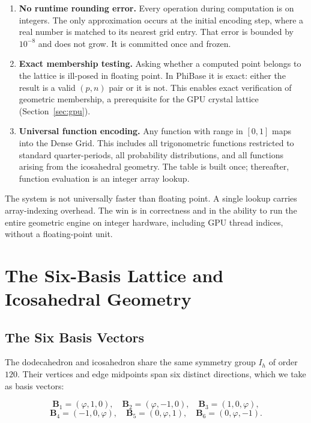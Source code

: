 \documentclass[12pt]{article}
\theoremstyle{definition}
\theoremstyle{remark}
\begin{document}
\begin{enumerate}[leftmargin=*]
\item \textbf{No runtime rounding error.}  Every operation during
computation is on integers.  The only approximation occurs at the
initial encoding step, where a real number is matched to its nearest
grid entry.  That error is bounded by $10^{-8}$ and does not grow.
It is committed once and frozen.

\item \textbf{Exact membership testing.}  Asking whether a computed
point belongs to the lattice is ill-posed in floating point.  In
PhiBase it is exact: either the result is a valid $(p,n)$ pair or
it is not.  This enables exact verification of geometric membership,
a prerequisite for the GPU crystal lattice (Section~\ref{sec:gpu}).

\item \textbf{Universal function encoding.}  Any function with range
in $[0,1]$ maps into the Dense Grid.  This includes all trigonometric
functions restricted to standard quarter-periods, all probability
distributions, and all functions arising from the icosahedral geometry.
The table is built once; thereafter, function evaluation is an integer
array lookup.
\end{enumerate}

The system is not universally faster than floating point.  A single
lookup carries array-indexing overhead.  The win is in correctness and
in the ability to run the entire geometric engine on integer hardware,
including GPU thread indices, without a floating-point unit.

\section{The Six-Basis Lattice and Icosahedral Geometry}

\subsection{The Six Basis Vectors}

The dodecahedron and icosahedron share the same symmetry group
$I_h$ of order $120$.  Their vertices and edge midpoints span six
distinct directions, which we take as basis vectors:

\[
  \mathbf{B}_1 = (\varphi,1,0),\quad
  \mathbf{B}_2 = (\varphi,-1,0),\quad
  \mathbf{B}_3 = (1,0,\varphi),
\]
\[
  \mathbf{B}_4 = (-1,0,\varphi),\quad
  \mathbf{B}_5 = (0,\varphi,1),\quad
  \mathbf{B}_6 = (0,\varphi,-1).
\]
\end{document}
